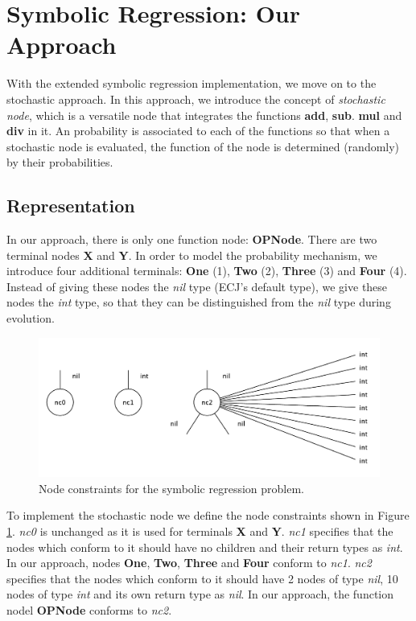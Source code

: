 \section{Symbolic Regression: Our Approach}
With the extended symbolic regression implementation, we move on to the stochastic approach. In this approach, we introduce the concept of \emph{stochastic node}, which is a versatile node that integrates the functions \textbf{add}, \textbf{sub}. \textbf{mul} and \textbf{div} in it. An probability is associated to each of the functions so that when a stochastic node is evaluated, the function of the node is determined (randomly) by their probabilities. 

\subsection{Representation}
In our approach, there is only one function node: \textbf{OPNode}. There are two terminal nodes \textbf{X} and \textbf{Y}. In order to model the probability mechanism, we introduce four additional terminals: \textbf{One} (1), \textbf{Two} (2), \textbf{Three} (3) and \textbf{Four} (4). Instead of giving these nodes the \emph{nil} type (ECJ's default type), we give these nodes the \emph{int} type, so that they can be distinguished from the \emph{nil} type during evolution. %
\begin{figure}
	\centering
	\includegraphics[width=1\linewidth]{./fig/symbolic_stochastic_ncs}
	\caption{Node constraints for the symbolic regression problem.}
	\label{fig:symb_stochastic_ncs}
\end{figure}

To implement the stochastic node we define the node constraints shown in Figure \ref{fig:symb_stochastic_ncs}. \emph{nc0} is unchanged as it is used for terminals \textbf{X} and \textbf{Y}. \emph{nc1} specifies that the nodes which conform to it should have no children and their return types as \emph{int}. In our approach, nodes \textbf{One}, \textbf{Two}, \textbf{Three} and \textbf{Four} conform to \emph{nc1}. \emph{nc2} specifies that the nodes which conform to it should have 2 nodes of type \emph{nil}, 10 nodes of type \emph{int} and its own return type as \emph{nil}. In our approach, the function nodel \textbf{OPNode} conforms to \emph{nc2}. 



